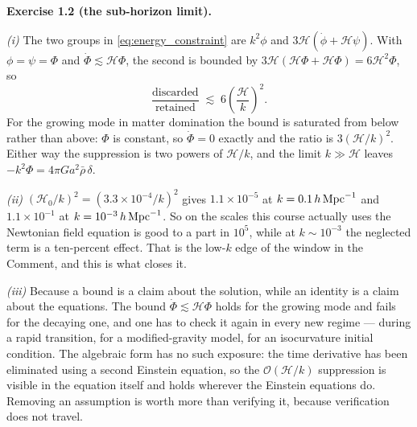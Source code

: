 \documentclass[a4paper,11pt]{article}
\def\cH{\mathcal{H}}
\newenvironment{solution}[1]
  {\par\medskip\noindent\textbf{#1}\par\nobreak\smallskip}
  {\par\medskip}
\begin{document}
\begin{solution}{Exercise 1.2 (the sub-horizon limit).}
\emph{(i)} The two groups in \eqref{eq:energy_constraint} are $k^2\phi$ and
$3\cH(\dot\phi + \cH\psi)$. With $\phi=\psi=\Phi$ and $\dot\Phi \lesssim \cH\Phi$,
the second is bounded by $3\cH(\cH\Phi + \cH\Phi) = 6\cH^2\Phi$, so
\begin{equation*}
\frac{\text{discarded}}{\text{retained}} \;\lesssim\; 6\left(\frac{\cH}{k}\right)^2 .
\end{equation*}
For the growing mode in matter domination the bound is saturated from below
rather than above: $\Phi$ is constant, so $\dot\Phi = 0$ exactly and the ratio is
$3(\cH/k)^2$. Either way the suppression is two powers of $\cH/k$, and the limit
$k \gg \cH$ leaves $-k^2\Phi = 4\pi Ga^2\bar\rho\,\delta$.

\emph{(ii)} $(\cH_0/k)^2 = (3.3\times10^{-4}/k)^2$ gives $1.1\times10^{-5}$ at
$k = 0.1\,h\,{\rm Mpc}^{-1}$ and $1.1\times10^{-1}$ at
$k = 10^{-3}\,h\,{\rm Mpc}^{-1}$. So on the scales this course actually uses the
Newtonian field equation is good to a part in $10^5$, while at
$k \sim 10^{-3}$ the neglected term is a ten-percent effect. That is the
low-$k$ edge of the window in the Comment, and this is what closes it.

\emph{(iii)} Because a bound is a claim about the solution, while an identity is
a claim about the equations. The bound $\dot\Phi \lesssim \cH\Phi$ holds for the
growing mode and fails for the decaying one, and one has to check it again in
every new regime --- during a rapid transition, for a modified-gravity model, for
an isocurvature initial condition. The algebraic form has no such exposure: the
time derivative has been eliminated using a second Einstein equation, so the
$\mathcal{O}(\cH/k)$ suppression is visible in the equation itself and holds
wherever the Einstein equations do. Removing an assumption is worth more than
verifying it, because verification does not travel.
\end{solution}
\end{document}
